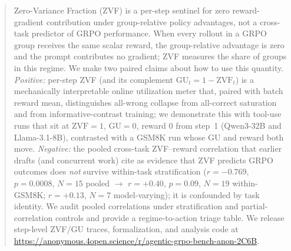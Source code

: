 \begin{abstract}
Zero-Variance Fraction (ZVF) is a per-step sentinel for zero reward-gradient
contribution under group-relative policy advantages, not a cross-task
predictor of GRPO performance. When every rollout in a GRPO group receives
the same scalar reward, the group-relative advantage is zero and the prompt
contributes no gradient; ZVF measures the share of groups in this regime.
We make two paired claims about how to use this quantity. \emph{Positive:}
per-step ZVF (and its complement $\mathrm{GU}_t = 1-\mathrm{ZVF}_t$) is a
mechanically interpretable online utilization meter that, paired with batch
reward mean, distinguishes all-wrong collapse from all-correct saturation
and from informative-contrast training; we demonstrate this with tool-use
runs that sit at $\mathrm{ZVF}{=}1$, $\mathrm{GU}{=}0$, reward $0$ from
step~1 (Qwen3-32B and Llama-3.1-8B), contrasted with a GSM8K run whose
GU and reward both move. \emph{Negative:} the pooled cross-task ZVF--reward
correlation that earlier drafts (and concurrent work) cite as evidence that
ZVF predicts GRPO outcomes does \emph{not} survive within-task
stratification ($r{=}-0.769$, $p{=}0.0008$, $N{=}15$ pooled $\to$ $r{=}+0.40$,
$p{=}0.09$, $N{=}19$ within-GSM8K; $r{=}+0.13$, $N{=}7$ model-varying); it is
confounded by task identity. We audit pooled correlations under stratification
and partial-correlation controls and provide a regime-to-action triage table.
We release step-level ZVF/GU traces, formalization, and analysis code at
\url{https://anonymous.4open.science/r/agentic-grpo-bench-anon-2C6B}.
\end{abstract}
